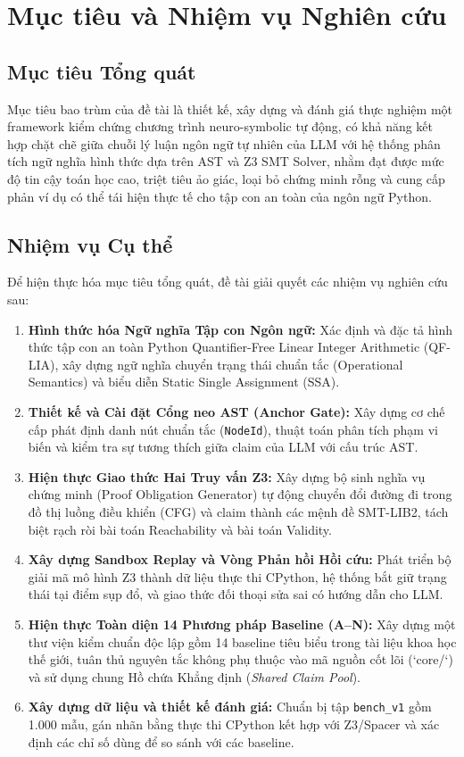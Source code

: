\section{Mục tiêu và Nhiệm vụ Nghiên cứu}
\label{sec:objectives}

\subsection{Mục tiêu Tổng quát}
Mục tiêu bao trùm của đề tài là thiết kế, xây dựng và đánh giá thực nghiệm một framework kiểm chứng chương trình neuro-symbolic tự động, có khả năng kết hợp chặt chẽ giữa chuỗi lý luận ngôn ngữ tự nhiên của LLM với hệ thống phân tích ngữ nghĩa hình thức dựa trên AST và Z3 SMT Solver, nhằm đạt được mức độ tin cậy toán học cao, triệt tiêu ảo giác, loại bỏ chứng minh rỗng và cung cấp phản ví dụ có thể tái hiện thực tế cho tập con an toàn của ngôn ngữ Python.

\subsection{Nhiệm vụ Cụ thể}
Để hiện thực hóa mục tiêu tổng quát, đề tài giải quyết các nhiệm vụ nghiên cứu sau:
\begin{enumerate}
    \item \textbf{Hình thức hóa Ngữ nghĩa Tập con Ngôn ngữ:} Xác định và đặc tả hình thức tập con an toàn Python Quantifier-Free Linear Integer Arithmetic (QF-LIA), xây dựng ngữ nghĩa chuyển trạng thái chuẩn tắc (Operational Semantics) và biểu diễn Static Single Assignment (SSA).
    \item \textbf{Thiết kế và Cài đặt Cổng neo AST (Anchor Gate):} Xây dựng cơ chế cấp phát định danh nút chuẩn tắc (\texttt{NodeId}), thuật toán phân tích phạm vi biến và kiểm tra sự tương thích giữa claim của LLM với cấu trúc AST.
    \item \textbf{Hiện thực Giao thức Hai Truy vấn Z3:} Xây dựng bộ sinh nghĩa vụ chứng minh (Proof Obligation Generator) tự động chuyển đổi đường đi trong đồ thị luồng điều khiển (CFG) và claim thành các mệnh đề SMT-LIB2, tách biệt rạch ròi bài toán Reachability và bài toán Validity.
    \item \textbf{Xây dựng Sandbox Replay và Vòng Phản hồi Hồi cứu:} Phát triển bộ giải mã mô hình Z3 thành dữ liệu thực thi CPython, hệ thống bắt giữ trạng thái tại điểm sụp đổ, và giao thức đối thoại sửa sai có hướng dẫn cho LLM.
    \item \textbf{Hiện thực Toàn diện 14 Phương pháp Baseline (A--N):} Xây dựng một thư viện kiểm chuẩn độc lập gồm 14 baseline tiêu biểu trong tài liệu khoa học thế giới, tuân thủ nguyên tắc không phụ thuộc vào mã nguồn cốt lõi (`core/`) và sử dụng chung Hồ chứa Khẳng định (\textit{Shared Claim Pool}).
    \item \textbf{Xây dựng dữ liệu và thiết kế đánh giá:} Chuẩn bị tập \texttt{bench\_v1} gồm 1.000 mẫu, gán nhãn bằng thực thi CPython kết hợp với Z3/Spacer và xác định các chỉ số dùng để so sánh với các baseline.
\end{enumerate}

